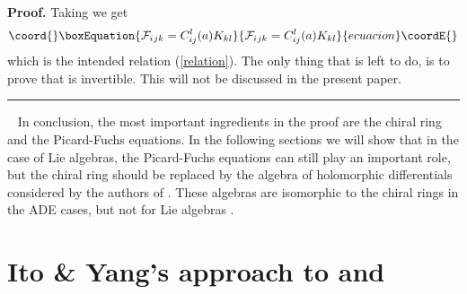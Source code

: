 \documentclass[a4paper,11pt]{article}
\newenvironment{proof}[1][Proof]{\textbf{#1.} }{\ \rule{0.5em}{0.5em}}
\numberwithin{equation}{section}
\begin{document}
\begin{proof}
\noindent Taking \coordHE{} we get 
\begin{equation}\coord{}\boxEquation{
\mathcal{F}_{i}{}_{jk}=C_{ij}^{l}(a)K_{kl}
}{
\mathcal{F}_{i}{}_{jk}=C_{ij}^{l}(a)K_{kl}
}{ecuacion}\coordE{}\end{equation}
which is the intended relation (\ref{relation}). The only thing that is left
to do, is to prove that \coordHE{} is invertible. This will not be discussed in the present
paper.
\end{proof}

\ \newline
\noindent In conclusion, the most important ingredients in the proof are the
chiral ring and the Picard-Fuchs equations. In the following sections we
will show that in the case of \coordHE{} Lie algebras, the Picard-Fuchs
equations can still play an important role, but the chiral ring should be
replaced by the algebra of holomorphic differentials considered by
the authors of \cite{MARS-MIRO-MORO:2000}. These algebras
are isomorphic to the chiral rings in the ADE cases, but not for Lie
algebras \coordHE{}.

\section{Ito \& Yang's approach to \coordHE{} and \coordHE{}}
\end{document}

